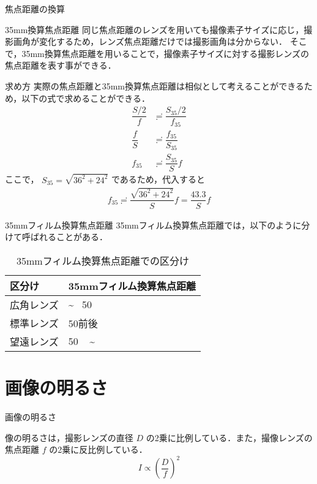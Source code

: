 \documentclass[8pt, jfont=ipaexm, t]{beamer} %
\begin{document}
\begin{frame}[allowframebreaks]{焦点距離の換算}
  \begin{block}{35mm換算焦点距離}
    同じ焦点距離のレンズを用いても撮像素子サイズに応じ，撮影画角が変化するため，レンズ焦点距離だけでは撮影画角は分からない．
    そこで，35mm換算焦点距離を用いることで，撮像素子サイズに対する撮影レンズの焦点距離を表す事ができる．
  \end{block}
  \newpage

\begin{block}{求め方}
  \small
  実際の焦点距離と35mm換算焦点距離は相似として考えることができるため，以下の式で求めることができる．
  \begin{align*}
    \dfrac{S / 2}{f} &\risingdotseq \dfrac{S_{35} / 2}{f_{35}} \\
    \dfrac{f}{S} &\risingdotseq \dfrac{f_{35}}{S_{35}}  \\
    f_{35} &\risingdotseq \dfrac{S_{35}}{S}f
  \end{align*}
  ここで， $S_{35} = \sqrt{36^2 + 24^2}$ であるため，代入すると
  \begin{align*}
    f_{35} \risingdotseq \dfrac{\sqrt{36^2 + 24^2}}{S} f = \dfrac{43.3}{S}f
  \end{align*}
\end{block}

\end{frame}

\begin{frame}{35mmフィルム換算焦点距離}
  35mmフィルム換算焦点距離では，以下のように分けて呼ばれることがある．
  \begin{table}[H]
    \centering
    \caption{35mmフィルム換算焦点距離での区分け}
    \begin{tabular}{|l|l|}
      \hline
      区分け & 35mmフィルム換算焦点距離 \\
      \hline
      広角レンズ & \textasciitilde ~ 50 \\
      標準レンズ & 50前後 \\
      望遠レンズ & 50 ~ \textasciitilde \\
      \hline
    \end{tabular}
  \end{table}
\end{frame}


\section{画像の明るさ}
\begin{frame}{画像の明るさ}
\begin{block}{}
  像の明るさは，撮影レンズの直径 $D$ の2乗に比例している．また，撮像レンズの焦点距離 $f$ の2乗に反比例している．
  \begin{equation}\label{ip}
    I \propto (\dfrac{D}{f})^2
  \end{equation}
\end{block}
\end{frame}
\end{document}
